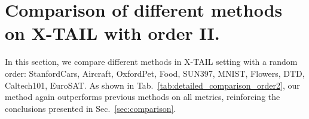 
\section{Comparison of different methods on X-TAIL with order II.}
\label{app:order2}
In this section, we compare different methods in X-TAIL setting with a random order: StanfordCars, Aircraft, OxfordPet, Food, SUN397, MNIST, Flowers, DTD, Caltech101, EuroSAT. As shown in Tab.~\ref{tab:detailed_comparison_order2}, our method again outperforms previous methods on all metrics, reinforcing the conclusions presented in Sec.~\ref{sec:comparison}.


